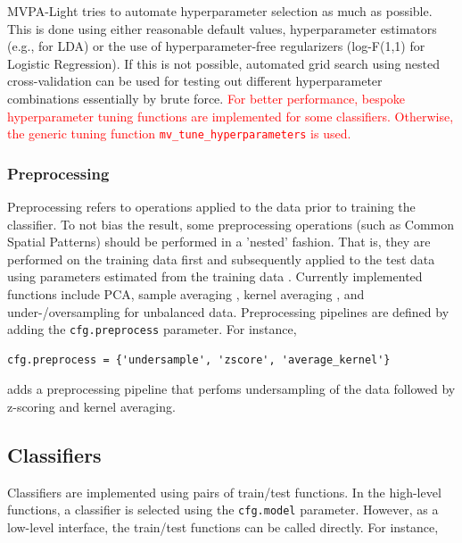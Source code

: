 \documentclass[utf8]{frontiersSCNS} %
\newcommand{\ttt}[1]{\texttt{#1}}
\newcommand{\red}[1]{\textcolor{red}{#1}}
\begin{document}
MVPA-Light tries to automate hyperparameter selection as much as possible. This is done using either reasonable default values, hyperparameter estimators (e.g., \cite{Ledoit2003HoneyMatrix} for LDA) or the use of  hyperparameter-free regularizers (log-F(1,1) for Logistic Regression). If this is not possible, automated grid search using nested cross-validation can be used for testing out different hyperparameter combinations essentially by brute force. \red{For better performance, bespoke hyperparameter tuning functions are implemented for some classifiers. Otherwise, the generic tuning function \ttt{mv\_tune\_hyperparameters} is used.}

\subsubsection{Preprocessing}\label{sec:preprocessing}

Preprocessing refers to operations applied to the data prior to training the classifier. To not bias the result, some preprocessing operations (such as Common Spatial Patterns) should be performed in a 'nested' fashion. That is, they are performed on the training data first and subsequently applied to the test data using parameters estimated from the training data \citep{Lemm2011,Varoquaux2017}. 
Currently implemented functions include PCA, sample averaging \citep{Cichy2017MultivariateSpace}, kernel averaging \citep{Treder2018}, and under-/oversampling for unbalanced data. Preprocessing pipelines are defined by adding the \ttt{cfg.preprocess} parameter. For instance,

\begin{verbatim}
cfg.preprocess = {'undersample', 'zscore', 'average_kernel'}
\end{verbatim}

adds a preprocessing pipeline that perfoms undersampling of the data followed by z-scoring and kernel averaging.

\subsection{Classifiers}\label{sec:classifiers}

Classifiers are implemented using pairs of train/test functions. In the high-level functions, a classifier is selected using the \ttt{cfg.model} parameter. However, as a low-level interface, the train/test functions can be called directly. For instance, 
\end{document}
